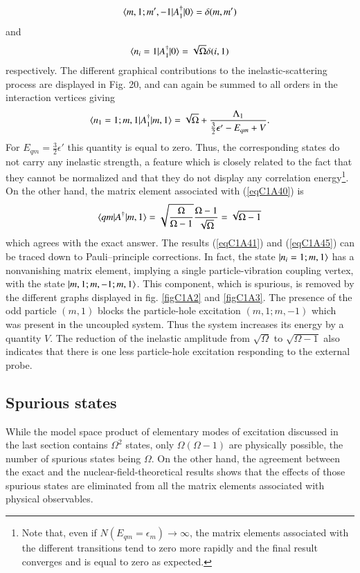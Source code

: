  \begin{align}\label{eqC1A42} 
\langle {m,1;m',-1|A_1^\dagger|0} \rangle=\delta(m,m')
 \end{align}
and
 \begin{align}\label{eqC1A43} 
\langle {n_i=1|A_1^\dagger|0} \rangle=\sqrt{\Omega}\delta(i,1)
 \end{align}
respectively. The different graphical contributions to the inelastic-scattering
process are displayed in Fig. 20, and can again be summed to all orders in the
interaction vertices giving
 \begin{align}\label{eqC1A44} 
\langle {n_1=1;m,1|A_1^\dagger|m,1} \rangle=\sqrt{\Omega}+\frac{\Lambda_1}{\frac{3}{2}\epsilon'-E_{qm}+V}.
 \end{align}
For $E_{qm}=\frac{3}{2}\epsilon'$ this quantity is equal to zero. Thus, the corresponding states
do not carry any inelastic strength, a feature which is closely related to the
fact that they cannot be normalized and that they do not display any correlation energy\footnote{Note that, even if $N(E_{qm}=\epsilon_m)\rightarrow\infty$, the matrix elements associated with the different transitions tend to zero more rapidly and the final result converges and is equal
to zero as expected.}.
On the other hand, the matrix element associated with (\ref{eqC1A40}) is
 \begin{align}\label{eqC1A45} 
\langle {qm|A^\dagger|m,1} \rangle=\sqrt{\frac{\Omega}{\Omega-1}}\frac{\Omega-1}{\sqrt{\Omega}}=\sqrt{\Omega-1}
 \end{align}
which agrees with the exact answer.
The results (\ref{eqC1A41}) and (\ref{eqC1A45}) can be traced down to Pauli--principle corrections. In fact, the state $|{n_i=1;m,1} \rangle$ has a nonvanishing matrix element,
implying a single particle-vibration coupling vertex, with the state $|{m,1;m,-1;m,1} \rangle$. This component, which is spurious, is removed by the different graphs displayed in fig. \ref{figC1A2} and \ref{figC1A3}. The presence of the odd particle
$(m, 1)$ blocks the particle-hole excitation $(m,1; m,- 1)$ which was present in
the uncoupled system. Thus the system increases its energy by a quantity $V$.
The reduction of the inelastic amplitude from $\sqrt{\Omega}$ to $\sqrt{\Omega-1}$  also indicates
that there is one less particle-hole excitation responding to the external probe.
\subsection{Spurious states}\label{C1S7sS3}
While the model space product of elementary modes of excitation discussed
in the last section contains $\Omega^2$ states, only $\Omega(\Omega-1)$ are physically possible,
the number of spurious states being $\Omega$. On the other hand, the agreement
between the exact and the nuclear-field-theoretical results shows that the effects of those spurious states are eliminated from all the matrix elements associated with physical observables.


